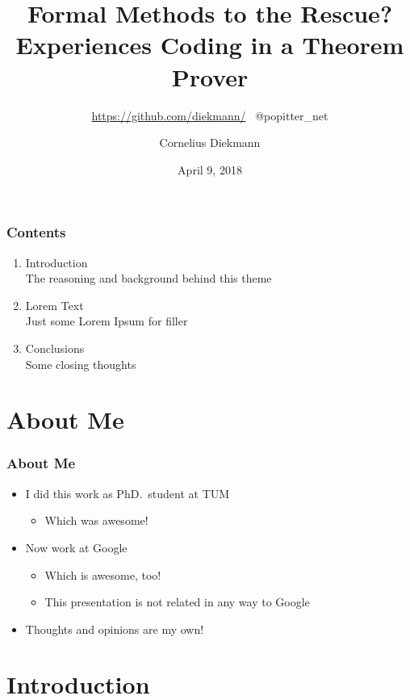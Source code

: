 \documentclass[aspectratio=169]{beamer}
\title{Formal Methods to the Rescue? Experiences Coding in a Theorem Prover}
\subtitle{\url{https://github.com/diekmann/} \  @popitter\_net}
\author{Cornelius Diekmann}
\date{April 9, 2018}
\begin{document}
\setcounter{showProgressBar}{0}
\setcounter{showSlideNumbers}{0}

\frame{\titlepage}


\begin{frame}
	\frametitle{Contents}
	\begin{enumerate}
		\item Introduction \\ \textcolor{ExecusharesGrey}{\footnotesize\hspace{1em} The reasoning and background behind this theme}
		\item Lorem Text  \\ \textcolor{ExecusharesGrey}{\footnotesize\hspace{1em} Just some Lorem Ipsum for filler}
		\item Conclusions \\ \textcolor{ExecusharesGrey}{\footnotesize\hspace{1em} Some closing thoughts}
	\end{enumerate}
\end{frame}


\setcounter{framenumber}{0}
\setcounter{showProgressBar}{1}
\setcounter{showSlideNumbers}{1}


\section{About Me}
\begin{frame}
	\frametitle{About Me}
	\begin{itemize}
		\item I did this work as PhD.\ student at TUM
		\begin{itemize}
			\item Which was awesome!
		\end{itemize}
		\item Now work at Google
		\begin{itemize}
			\item Which is awesome, too!
			\item This presentation is not related in any way to Google
		\end{itemize}
		\item Thoughts and opinions are my own!
	\end{itemize}
\end{frame}



\section{Introduction}
\end{document}
